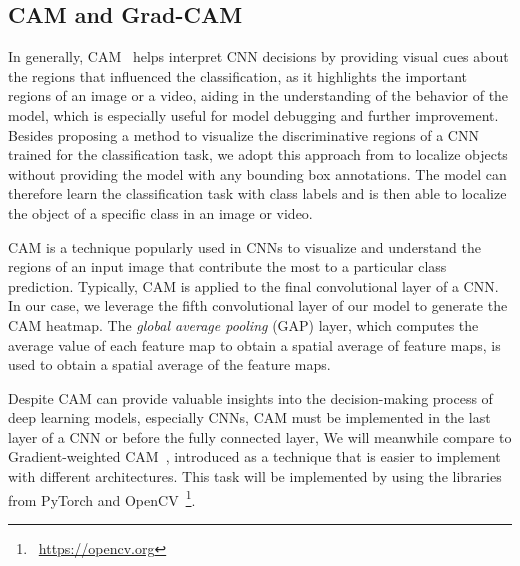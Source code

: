 \subsection{CAM and Grad-CAM} %
\label{sec:optim:cam}

In generally, 
CAM~\cite{ZhouKLOT16} helps interpret CNN decisions by providing visual cues about the regions that influenced the classification, 
as it highlights the important regions of an image or a video, 
aiding in the understanding of the behavior of the model, 
which is especially useful for model debugging and further improvement. 
Besides proposing a method to visualize the discriminative regions of a CNN trained for the classification task, 
we adopt this approach from \citet{ZhouKLOT16} to localize objects without providing the model with any bounding box annotations. 
The model can therefore learn the classification task with class labels and is then able to localize the object of a specific class in an image or video. 

CAM is a technique popularly used in CNNs to visualize and understand the regions of an input image that contribute the most to a particular class prediction. 
Typically,
CAM is applied to the final convolutional layer of a CNN. 
In our case, we leverage the fifth convolutional layer of our model to generate the CAM heatmap.
The \textit{global average pooling} (GAP) layer, 
which computes the average value of each feature map to obtain a spatial average of feature maps, 
is used to obtain a spatial average of the feature maps. 

Despite CAM can provide valuable insights into the decision-making process of deep learning models, especially CNNs, 
CAM must be implemented in the last layer of a CNN or before the fully connected layer, 
We will meanwhile compare to Gradient-weighted CAM~\cite{SelvarajuCDVPB17}, 
introduced as a technique that is easier to implement with different architectures.
This task will be implemented by using the libraries from PyTorch and OpenCV~\footnote{~\url{https://opencv.org}}.

